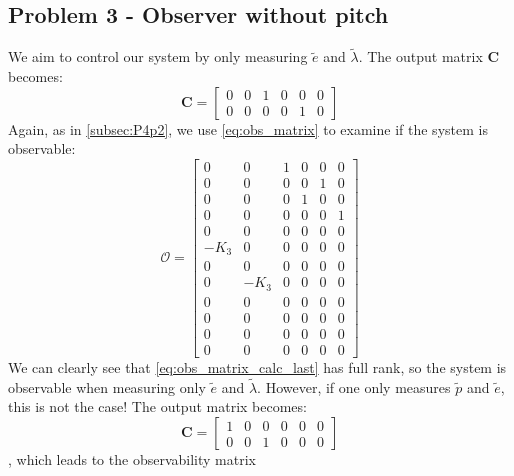 \subsection{Problem 3 - Observer without pitch}\label{subsec:P4p3}
We aim to control our system by only measuring $\tilde{e}$ and $\tilde{\lambda}$. The output matrix \textbf{C} becomes:
\begin{equation}\label{eq:C_P4p3}
\mathbf{C} = 
    \begin{bmatrix}
    0 & 0 & 1 & 0 & 0 & 0 \\
    0 & 0 & 0 & 0 & 1 & 0 
    \end{bmatrix}
\end{equation}
Again, as in \ref{subsec:P4p2}, we use \eqref{eq:obs_matrix} to examine if the system is observable:
\begin{equation}\label{eq:obs_matrix_calc_last}
    \mathcal {O}=
    {\begin{bmatrix}
        0 & 0 & 1 & 0 & 0 & 0\\
        0 & 0 & 0 & 0 & 1 & 0\\
        0 & 0 & 0 & 1 & 0 & 0\\
        0 & 0 & 0 & 0 & 0 & 1\\
        0 & 0 & 0 & 0 & 0 & 0\\
        -K_3 & 0 & 0 & 0 & 0 & 0\\
        0 & 0 & 0 & 0 & 0 & 0\\
        0 & -K_3 & 0 & 0 & 0 & 0\\
        0 & 0 & 0 & 0 & 0 & 0\\
        0 & 0 & 0 & 0 & 0 & 0\\
        0 & 0 & 0 & 0 & 0 & 0\\
        0 & 0 & 0 & 0 & 0 & 0
    \end{bmatrix}}
\end{equation}
We can clearly see that \eqref{eq:obs_matrix_calc_last} has full rank, so the system is observable when measuring only $\tilde{e}$ and $\tilde{\lambda}$. However, if one only measures $\tilde{p}$ and $\tilde{e}$, this is not the case! The output matrix becomes:
\begin{equation}\nonumber
\mathbf{C} = 
    \begin{bmatrix}
    1 & 0 & 0 & 0 & 0 & 0 \\
    0 & 0 & 1 & 0 & 0 & 0 
    \end{bmatrix}
\end{equation},
which leads to the observability matrix
